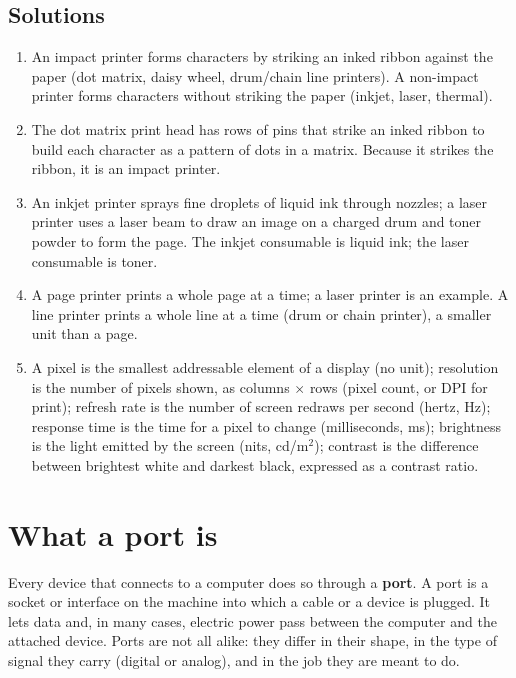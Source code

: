 \subsection*{Solutions}
\begingroup\small
\begin{enumerate}[label=\arabic*.]
  \item An impact printer forms characters by striking an inked ribbon
    against the paper (dot matrix, daisy wheel, drum/chain line printers). A
    non-impact printer forms characters without striking the paper (inkjet,
    laser, thermal).
  \item The dot matrix print head has rows of pins that strike an inked
    ribbon to build each character as a pattern of dots in a matrix. Because
    it strikes the ribbon, it is an impact printer.
  \item An inkjet printer sprays fine droplets of liquid ink through nozzles;
    a laser printer uses a laser beam to draw an image on a charged drum and
    toner powder to form the page. The inkjet consumable is liquid ink; the
    laser consumable is toner.
  \item A page printer prints a whole page at a time; a laser printer is an
    example. A line printer prints a whole line at a time (drum or chain
    printer), a smaller unit than a page.
  \item A pixel is the smallest addressable element of a display (no unit);
    resolution is the number of pixels shown, as columns $\times$ rows (pixel
    count, or DPI for print); refresh rate is the number of screen redraws per
    second (hertz, Hz); response time is the time for a pixel to change
    (milliseconds, ms); brightness is the light emitted by the screen (nits,
    cd/m$^2$); contrast is the difference between brightest white and darkest
    black, expressed as a contrast ratio.
\end{enumerate}
\endgroup

\section{What a port is}
Every device that connects to a computer does so through a \textbf{port}. A
port is a socket or interface on the machine into which a cable or a device
is plugged. It lets data and, in many cases, electric power pass between the
computer and the attached device. Ports are not all alike: they differ in
their shape, in the type of signal they carry (digital or analog), and in the
job they are meant to do.

